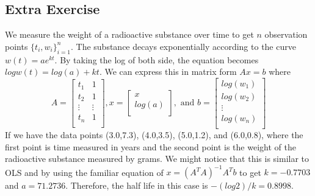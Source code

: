 \documentclass[letterpaper,12pt]{article}
\theoremstyle{definition}
\begin{document}
\subsection*{Extra Exercise}
We measure the weight of a radioactive substance over time to get $n$ observation points $\{t_i,w_i\}_{i=1}^n$. The substance decays exponentially according to the curve $w(t)=ae^{kt}$. By taking the log of both side, the equation becomes $log w(t)=log(a)+kt$. We can express this in matrix form $Ax=b$ where
\[A=\begin{bmatrix}
t_1&1\\
t_2&1\\
\vdots&\vdots\\
t_n&1 \\
\end{bmatrix},
x=\begin{bmatrix}
x \\
log(a)\\
\end{bmatrix},
\text{ and }
b=\begin{bmatrix}
log(w_1)\\
log(w_2)\\
\vdots \\
log(w_n)\\
\end{bmatrix}
\]
If we have the data points (3.0,7.3), (4.0,3.5), (5.0,1.2), and (6.0,0.8), where the first point is time measured in years and the second point is the weight of the radioactive substance measured by grams. We might notice that this is similar to OLS and by using the familiar equation of $x=(A^TA)^{-1}A^Tb$ to get $k=-0.7703$ and $a=71.2736$. Therefore, the half life in this case is $-(log2)/k=0.8998$.
\end{document}
